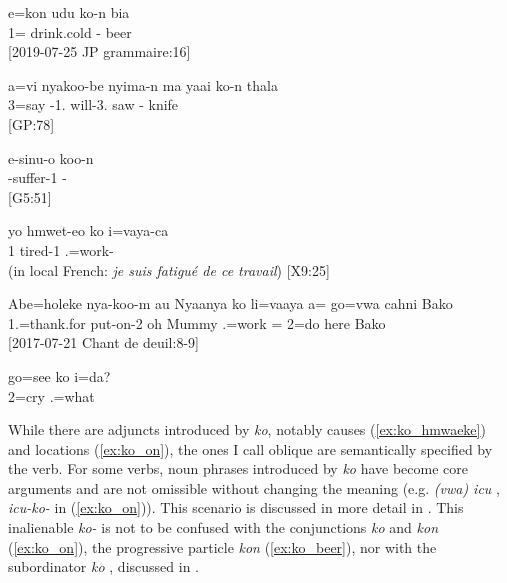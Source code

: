 \ea\label{ex:ko_beer}
\gll e=kon udu ko-n bia\\
 1= drink.cold - beer\\
\glt {} {[2019-07-25 JP grammaire:16]}
\z


\ea\label{ex:ko_knife}
\gll a=vi nyakoo-be nyima-n ma yaai ko-n thala\\
 3=say -1. will-3.  saw - knife\\
\glt {} {[GP:78]}
\z

\ea \label{ex:ko_stim}
\gll e-sinu-o koo-n\\
 -suffer-1 -\\
\glt {} {[G5:51]}
 \z
 
\ea
\gll yo hmwet-eo ko i=vaya-ca\\
 1 tired-1  .=work-\\
\glt {} (in local French: \textit{je suis fatigué de ce travail}) {[X9:25]}
\z


\ea\label{ex:ko_oblique}
\gll Abe=holeke nya-koo-m au Nyaanya ko li=vaaya a= go=vwa cahni Bako\\
 1.=thank.for put-on-2 oh Mummy  .=work = 2=do here Bako\\
\glt {} {[2017-07-21 Chant de deuil:8-9]}
\z

\ea
\gll go=see ko i=da?\\
 2=cry  .=what\\
\glt {}
\z 

While there are adjuncts introduced by \textit{ko}, notably causes (\ref{ex:ko_hmwaeke}) and locations (\ref{ex:ko_on}), the ones I call oblique are semantically specified by the verb. For some verbs, noun phrases introduced by \textit{ko} have become core arguments and are not omissible without changing the meaning (e.g. \textit{(vwa) icu} , \textit{icu-ko-}  in (\ref{ex:ko_on})). This scenario is discussed in more detail in . 
This inalienable \textit{ko-} is not to be confused with the conjunctions \textit{ko}  and \textit{kon}  (\ref{ex:ko_on}), the progressive particle \textit{kon} (\ref{ex:ko_beer}), nor with the subordinator \textit{ko} , discussed in .



